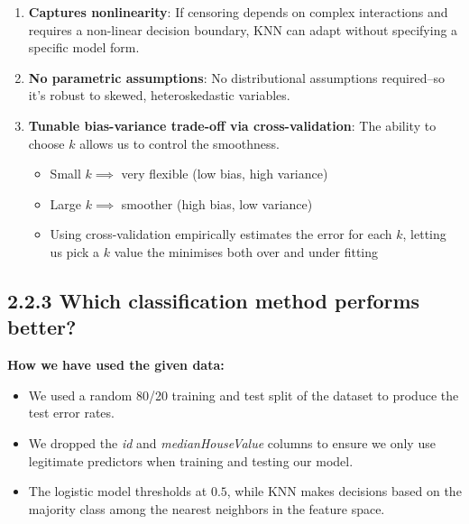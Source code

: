 \documentclass[
]{article}
\begin{document}
\begin{enumerate}
  \item \textbf{Captures nonlinearity}: If censoring depends on complex interactions and requires a non-linear decision boundary, KNN can adapt without specifying a specific model form.
  \item \textbf{No parametric assumptions}: No distributional assumptions required--so it's robust to skewed, heteroskedastic variables.
  \item \textbf{Tunable bias-variance trade-off via cross-validation}: The ability to choose $k$ allows us to control the smoothness.
    \begin{itemize}
        \item Small $k \implies$ very flexible (low bias, high variance)
        \item Large $k \implies$ smoother (high bias, low variance)
        \item Using cross-validation empirically estimates the error for each $k$, letting us pick a $k$ value the minimises both over and under fitting
    \end{itemize}
\end{enumerate}

\subsection{2.2.3 Which classification method performs
better?}\label{which-classification-method-performs-better}

\textbf{How we have used the given data:}

\begin{itemize}
  \item We used a random 80/20 training and test split of the dataset to produce the test error rates.
  \item We dropped the \textit{id} and \textit{medianHouseValue} columns to ensure we only use legitimate predictors when training and testing our model.
  \item The logistic model thresholds at $0.5$, while KNN makes decisions based on the majority class among the nearest neighbors in the feature space.
\end{itemize}
\end{document}
